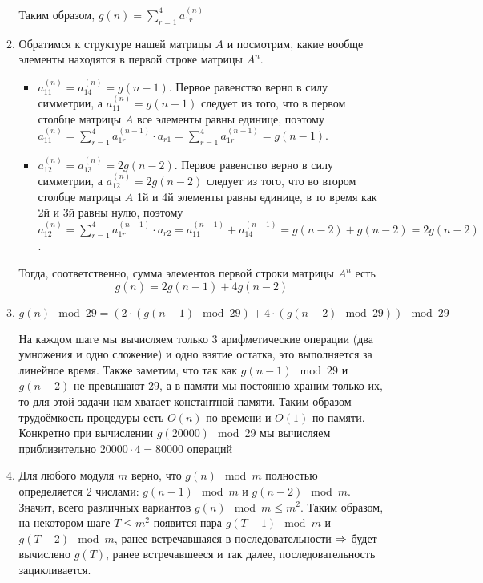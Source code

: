 \documentclass[a4paper,12pt]{article}
\begin{document}
\begin{solution}
\begin{enumerate}
\begin{enumerate}
\begin{itemize}
			\end{itemize}
			
			Таким образом, $g(n) =  \displaystyle \sum_{r=1}^{4} a^{(n)}_{1r}$
			
			\item Обратимся к структуре нашей матрицы $A$ и посмотрим, какие вообще элементы находятся в первой строке матрицы $A^n$.
			
			\begin{itemize}
				\item $a^{(n)}_{11} = a^{(n)}_{14} = g(n-1)$. Первое равенство верно в силу симметрии, а $a^{(n)}_{11} = g(n-1)$ следует из того, что в первом столбце матрицы $A$ все элементы равны единице, поэтому $a^{(n)}_{11} = \displaystyle \sum_{r=1}^{4} a^{(n-1)}_{1r} \cdot a_{r1} = \displaystyle \sum_{r=1}^{4} a^{(n-1)}_{1r} = g(n-1)$.
				
				\item $a^{(n)}_{12} = a^{(n)}_{13} = 2g(n-2)$. Первое равенство верно в силу симметрии, а $a^{(n)}_{12} = 2g(n-2)$ следует из того, что во втором столбце матрицы $A$ 1й и 4й элементы равны единице, в то время как 2й и 3й равны нулю, поэтому $a^{(n)}_{12} = \displaystyle \sum_{r=1}^{4} a^{(n-1)}_{1r} \cdot a_{r2} = a^{(n-1)}_{11} + a^{(n-1)}_{14} = g(n-2) + g(n-2) = 2g(n-2)$.
			\end{itemize}
			
			Тогда, соответственно, сумма элементов первой строки матрицы $A^n$ есть $$g(n) = 2g(n-1) + 4g(n-2)$$
			
			\item $g(n) \mod 29 = (2\cdot (g(n-1) \mod 29) + 4\cdot(g(n-2) \mod 29)) \mod 29$
			
			На каждом шаге мы вычисляем только 3 арифметические операции (два умножения и одно сложение) и одно взятие остатка, это выполняется за линейное время. Также заметим, что так как $g(n-1) \mod 29$ и $g(n-2)$ не превышают 29, а в памяти мы постоянно храним только их, то для этой задачи нам хватает константной памяти. Таким образом трудоёмкость процедуры есть $O(n)$ по времени и $O(1)$ по памяти. Конкретно при вычислении $g(20000) \mod 29$ мы вычисляем приблизительно $20000 \cdot 4 = 80000$ операций
			
			\item Для любого модуля $m$ верно, что $g(n) \mod m$ полностью определяется 2 числами: $g(n-1) \mod m$ и $g(n-2) \mod m$. Значит, всего различных вариантов $g(n) \mod m \le m^2$. Таким образом, на некотором шаге $T \le m^2$ появится пара $g(T-1) \mod m$ и $g(T-2) \mod m$, ранее встречавшаяся в последовательности $\Rightarrow$ будет вычислено $g(T)$, ранее встречавшееся и так далее, последовательность зацикливается.
			

\end{enumerate}
\end{enumerate}
\end{solution}
\end{document}
